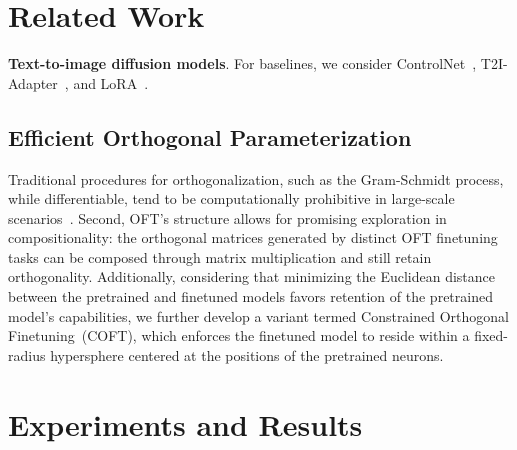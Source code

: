 \section{Related Work}

\textbf{Text-to-image diffusion models}. For baselines, we consider ControlNet~\cite{zhang2023adding}, T2I-Adapter~\cite{mou2023t2i}, and LoRA~\cite{hulora2022}. \subsection{Efficient Orthogonal Parameterization}\label{sect:eff_ortho}

Traditional procedures for orthogonalization, such as the Gram-Schmidt process, while differentiable, tend to be computationally prohibitive in large-scale scenarios~\cite{liu2021orthogonal}. Second, OFT's structure allows for promising exploration in compositionality: the orthogonal matrices generated by distinct OFT finetuning tasks can be composed through matrix multiplication and still retain orthogonality. Additionally, considering that minimizing the Euclidean distance between the pretrained and finetuned models favors retention of the pretrained model’s capabilities, we further develop a variant termed Constrained Orthogonal Finetuning~(COFT), which enforces the finetuned model to reside within a fixed-radius hypersphere centered at the positions of the pretrained neurons. \section{Experiments and Results}

